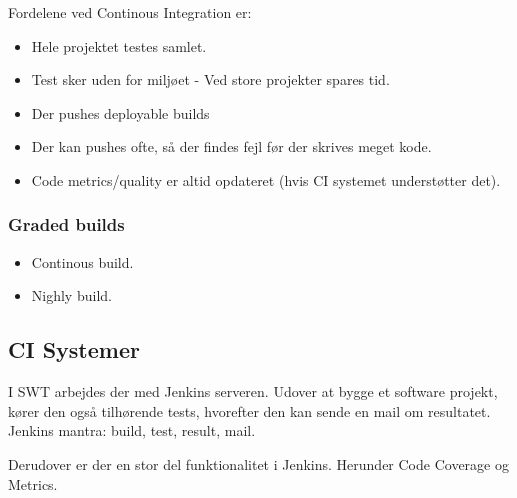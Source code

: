 Fordelene ved Continous Integration er:

\begin{itemize}
	\item Hele projektet testes samlet.
	\item Test sker uden for miljøet - Ved store projekter spares tid.
	\item Der pushes deployable builds 
	\item Der kan pushes ofte, så der findes fejl før der skrives meget kode.
	\item Code metrics/quality er altid opdateret (hvis CI systemet understøtter det).
\end{itemize}

\subsubsection{Graded builds}

\begin{itemize}
	\item Continous build.
	\item Nighly build.
\end{itemize}

\subsection{CI Systemer}
I SWT arbejdes der med Jenkins serveren. Udover at bygge et software projekt, kører den også tilhørende tests, hvorefter den kan sende en mail om resultatet.
Jenkins mantra: build, test, result, mail. 

Derudover er der en stor del funktionalitet i Jenkins. Herunder Code Coverage og Metrics.



